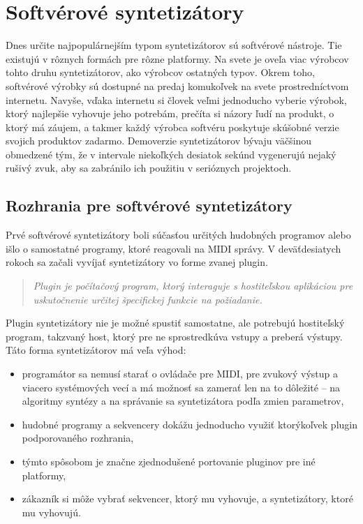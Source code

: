 \chapter{Softvérové syntetizátory}
Dnes určite najpopulárnejším typom syntetizátorov sú softvérové nástroje. Tie existujú v rôznych formách pre rôzne platformy. Na svete je oveľa viac výrobcov tohto druhu syntetizátorov, ako výrobcov ostatných typov. Okrem toho, softvérové výrobky sú dostupné na predaj komukoľvek na svete prostredníctvom internetu. Navyše, vďaka internetu si človek veľmi jednoducho vyberie výrobok, ktorý najlepšie vyhovuje jeho potrebám, prečíta si názory ľudí na produkt, o ktorý má záujem, a takmer každý výrobca softvéru poskytuje skúšobné verzie svojich produktov zadarmo. Demoverzie syntetizátorov bývaju väčšinou obmedzené tým, že v intervale niekoľkých desiatok sekúnd vygenerujú nejaký rušivý zvuk, aby sa zabránilo ich použitiu v serióznych projektoch.

\section{Rozhrania pre softvérové syntetizátory}
Prvé softvérové syntetizátory boli súčasťou určitých hudobných programov alebo išlo o samostatné programy, ktoré reagovali na MIDI správy. V deväťdesiatych rokoch sa začali vyvíjať syntetizátory vo forme zvanej \bq plugin\eq .

\begin{quote}
\textit{Plugin je počítačový program, ktorý interaguje s hostiteľskou aplikáciou pre uskutočnenie určitej špecifickej funkcie \bq na požiadanie\eq .}\cite{b05}
\end{quote}

Plugin syntetizátory nie je možné spustiť samostatne, ale potrebujú hostiteľský program, takzvaný \bq host\eq , ktorý pre ne sprostredkúva vstupy a preberá výstupy. Táto forma syntetizátorov má veľa výhod:
\begin{itemize}
\setlength{\itemsep}{-0.5ex}
\item programátor sa nemusí starať o ovládače pre MIDI, pre zvukový výstup a viacero systémových vecí a má možnosť sa zamerať len na to dôležité -- na algoritmy syntézy a na správanie sa syntetizátora podľa zmien parametrov,
\item hudobné programy a sekvencery dokážu jednoducho využiť ktorýkoľvek plugin podporovaného rozhrania,
\item týmto spôsobom je značne zjednodušené portovanie pluginov pre iné platformy,
\item zákazník si môže vybrať sekvencer, ktorý mu vyhovuje, a syntetizátory, ktoré mu vyhovujú.
\end{itemize}

